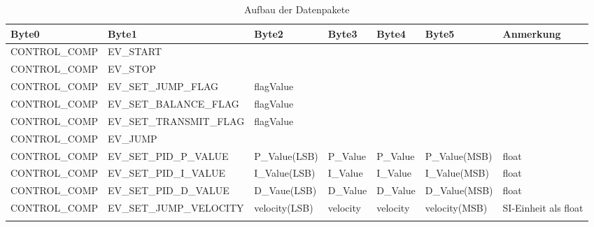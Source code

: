 \documentclass{article}
\begin{document}
\begin{landscape}

\begin{table}[]
\centering
\caption{Aufbau der Datenpakete}
\label{my-label}
\begin{tabular}{|l|l|l|l|l|l|l|}
\hline
\textbf{Byte0} & \textbf{Byte1}                  & \textbf{Byte2}      & \textbf{Byte3} & \textbf{Byte4} & \textbf{Byte5} & \textbf{Anmerkung}   \\ \hline
CONTROL\_COMP  & EV\_START                       &                     &                &                &                &                      \\ \hline
CONTROL\_COMP  & EV\_STOP                        &                     &                &                &                &                      \\ \hline
CONTROL\_COMP  & EV\_SET\_JUMP\_FLAG             & flagValue           &                &                &                &                      \\ \hline
CONTROL\_COMP  & EV\_SET\_BALANCE\_FLAG          & flagValue           &                &                &                &                      \\ \hline
CONTROL\_COMP  & EV\_SET\_TRANSMIT\_FLAG         & flagValue           &                &                &                &                      \\ \hline
CONTROL\_COMP  & EV\_JUMP                        &                     &                &                &                &                      \\ \hline
CONTROL\_COMP  & EV\_SET\_PID\_P\_VALUE          & P\_Value(LSB)       & P\_Value       & P\_Value       & P\_Value(MSB)  & float                \\ \hline
CONTROL\_COMP  & EV\_SET\_PID\_I\_VALUE          & I\_Value(LSB)       & I\_Value       & I\_Value       & I\_Value(MSB)  & float                \\ \hline
CONTROL\_COMP  & EV\_SET\_PID\_D\_VALUE          & D\_Vaue(LSB)        & D\_Value       & D\_Value       & D\_Value(MSB)  & float                \\ \hline
CONTROL\_COMP  & EV\_SET\_JUMP\_VELOCITY         & velocity(LSB)       & velocity       & velocity       & velocity(MSB)  & SI-Einheit als float \\ \hline
               &                                 &                     &                &                &                &                      \\ \hline

\end{tabular}
\end{table}
\end{landscape}
\end{document}
